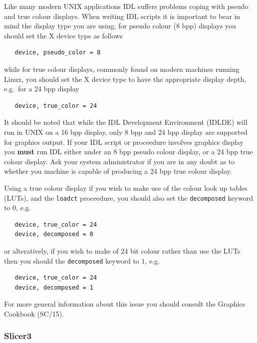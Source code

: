 \documentclass[twoside,11pt]{article}
\newcommand{\xref}[3]{#1}
\begin{document}
Like many modern UNIX applications IDL suffers problems coping with pseudo and true colour displays. When writing IDL scripts it is important to bear in mind the display type you are using, for pseudo colour (8 bpp) displays you should set the X device type as follows

\small\begin{verbatim}
   device, pseudo_color = 8
\end{verbatim}\normalsize

while for true colour displays, commonly found on modern machines running Linux, you should set the X device type to have the appropriate display depth, e.g.\ for a 24 bpp display

\small\begin{verbatim}
   device, true_color = 24
\end{verbatim}\normalsize

It should be noted that while the IDL Development Environment (IDLDE) will run in UNIX on a 16 bpp display, only 8 bpp and 24 bpp display are supported for graphics output. If your IDL script or proceedure involves graphics display you {\bf must} run IDL either under an 8 bpp pseudo colour display, or a 24 bpp true colour display. Ask your system administrator if you are in any doubt as to whether you machine is capable of producing a 24 bpp true colour display.

Using a true colour display if you wish to make use of the colour look up tables (LUTs), and the {\tt loadct} proceedure, you should also set the {\tt decomposed} keyword to $0$, e.g.\

\small\begin{verbatim}
   device, true_color = 24
   device, decomposed = 0
\end{verbatim}\normalsize

or alteratively, if you wish to make of 24 bit colour rather than use the LUTs then you should the {\tt decomposed} keyword to $1$, e.g.\

\small\begin{verbatim}
   device, true_color = 24
   device, decomposed = 1
\end{verbatim}\normalsize

For more general information about this issue you should consult the \xref{Graphics Cookbook}{sc15}{sc15_display} (SC/15).

\subsubsection{Slicer3}
\end{document}
